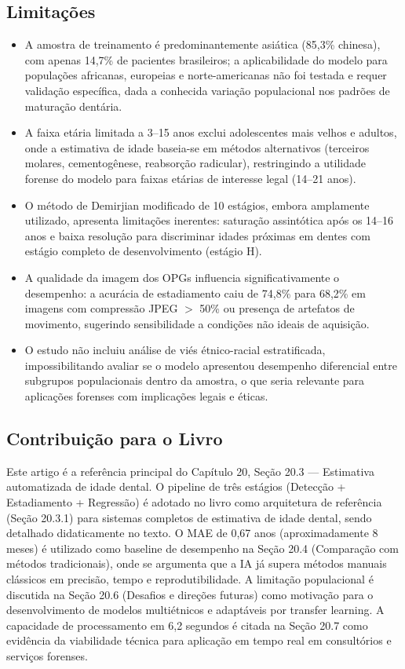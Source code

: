 \subsection{Limitações}
\begin{itemize}
  \item A amostra de treinamento é predominantemente asiática (85,3\%
        chinesa), com apenas 14,7\% de pacientes brasileiros; a
        aplicabilidade do modelo para populações africanas, europeias
        e norte-americanas não foi testada e requer validação
        específica, dada a conhecida variação populacional nos padrões
        de maturação dentária.
  \item A faixa etária limitada a 3--15 anos exclui adolescentes mais
        velhos e adultos, onde a estimativa de idade baseia-se em
        métodos alternativos (terceiros molares, cementogênese,
        reabsorção radicular), restringindo a utilidade forense do
        modelo para faixas etárias de interesse legal (14--21 anos).
  \item O método de Demirjian modificado de 10 estágios, embora
        amplamente utilizado, apresenta limitações inerentes:
        saturação assintótica após os 14--16 anos e baixa resolução
        para discriminar idades próximas em dentes com estágio
        completo de desenvolvimento (estágio H).
  \item A qualidade da imagem dos OPGs influencia significativamente o
        desempenho: a acurácia de estadiamento caiu de 74,8\% para
        68,2\% em imagens com compressão JPEG $>$ 50\% ou presença
        de artefatos de movimento, sugerindo sensibilidade a
        condições não ideais de aquisição.
  \item O estudo não incluiu análise de viés étnico-racial
        estratificada, impossibilitando avaliar se o modelo apresentou
        desempenho diferencial entre subgrupos populacionais dentro da
        amostra, o que seria relevante para aplicações forenses com
        implicações legais e éticas.
\end{itemize}

\subsection{Contribuição para o Livro}
Este artigo é a referência principal do Capítulo 20, Seção 20.3 —
Estimativa automatizada de idade dental. O pipeline de três estágios
(Detecção + Estadiamento + Regressão) é adotado no livro como
arquitetura de referência (Seção 20.3.1) para sistemas completos de
estimativa de idade dental, sendo detalhado didaticamente no texto.
O MAE de 0,67 anos (aproximadamente 8 meses) é utilizado como baseline
de desempenho na Seção 20.4 (Comparação com métodos tradicionais),
onde se argumenta que a IA já supera métodos manuais clássicos em
precisão, tempo e reprodutibilidade. A limitação populacional é
discutida na Seção 20.6 (Desafios e direções futuras) como motivação
para o desenvolvimento de modelos multiétnicos e adaptáveis por
transfer learning. A capacidade de processamento em 6,2 segundos é
citada na Seção 20.7 como evidência da viabilidade técnica para
aplicação em tempo real em consultórios e serviços forenses.

